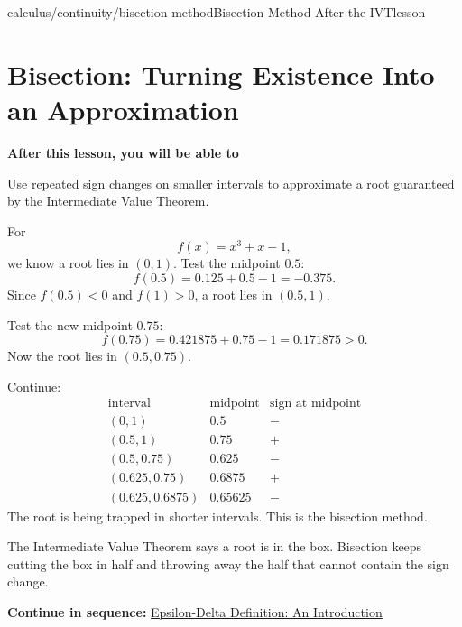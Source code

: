 \documentclass[11pt,openany]{book}
\theoremstyle{bgplain}
\newcommand{\webnext}[2]{%
  \par\addvspace{1.2em}\noindent{\color{BGLine}\rule{\textwidth}{0.35pt}}\par\smallskip
  {\small\color{BGGray}\textbf{Continue in sequence:} \hyperlink{web:#1}{#2}}\par
}
\newcommand{\lessonobjective}[1]{%
  \par\Needspace{4\baselineskip}\addvspace{0.6em}%
  {\bfseries\color{BGInk}After this lesson, you will be able to}\par\smallskip
  #1\par\addvspace{0.5em}%
}
\begin{document}
\begin{webpage}{calculus/continuity/bisection-method}{Bisection Method After the IVT}{lesson}
\section{Bisection: Turning Existence Into an Approximation}

\lessonobjective{
Use repeated sign changes on smaller intervals to approximate a root guaranteed by the Intermediate Value Theorem.
}

For
\[
  f(x)=x^3+x-1,
\]
we know a root lies in \((0,1)\). Test the midpoint \(0.5\):
\[
  f(0.5)=0.125+0.5-1=-0.375.
\]
Since \(f(0.5)<0\) and \(f(1)>0\), a root lies in \((0.5,1)\).

Test the new midpoint \(0.75\):
\[
  f(0.75)=0.421875+0.75-1=0.171875>0.
\]
Now the root lies in \((0.5,0.75)\).

Continue:
\[
\begin{array}{c|c|c}
\text{interval}&\text{midpoint}&\text{sign at midpoint}\\
\hline
(0,1)&0.5&-\\
(0.5,1)&0.75&+\\
(0.5,0.75)&0.625&-\\
(0.625,0.75)&0.6875&+\\
(0.625,0.6875)&0.65625&-
\end{array}
\]
The root is being trapped in shorter intervals. This is the bisection method.

\begin{bgconcept}
The Intermediate Value Theorem says a root is in the box. Bisection keeps cutting the box in half and throwing away the half that cannot contain the sign change.
\end{bgconcept}
\webnext{calculus/limits/epsilon-delta-introduction}{Epsilon-Delta Definition: An Introduction}
\end{webpage}
\end{document}
